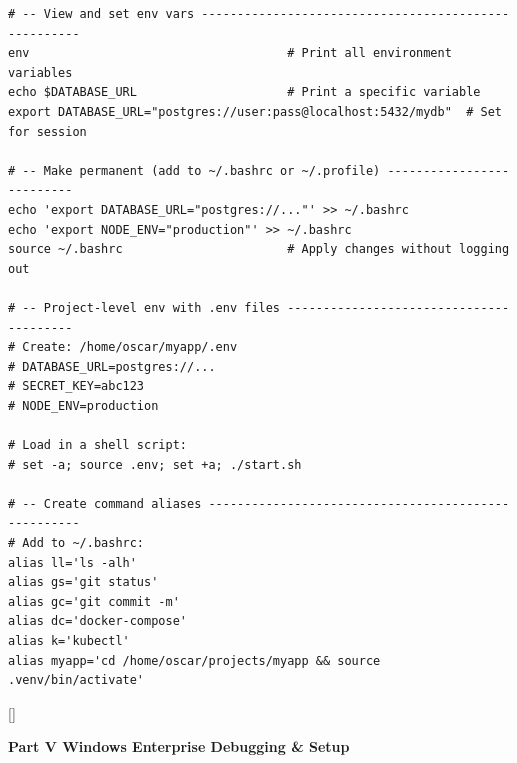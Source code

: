\documentclass[11pt, letterpaper]{article}
\newcommand{\bluesections}{%
  \titleformat{\section}{\large\bfseries\color{sectionblue}}{}{0em}{}[\color{sectionblue}\titlerule]%
  \titleformat{\subsection}{\normalsize\bfseries\color{sectionblue!80!black}}{}{0em}{}%
}
\newcommand{\partbanner}[3]{%
  \begin{tcolorbox}[colback=#1, colframe=#2, boxrule=1.2pt, arc=4pt,
    left=8pt, right=8pt, top=6pt, bottom=6pt]
    \begin{center}{\LARGE\bfseries #3}\end{center}
  \end{tcolorbox}%
}
\begin{document}
\begin{lstlisting}[style=shell, caption={Environment variables and shell configuration}]
# -- View and set env vars -----------------------------------------------------
env                                    # Print all environment variables
echo $DATABASE_URL                     # Print a specific variable
export DATABASE_URL="postgres://user:pass@localhost:5432/mydb"  # Set for session

# -- Make permanent (add to ~/.bashrc or ~/.profile) --------------------------
echo 'export DATABASE_URL="postgres://..."' >> ~/.bashrc
echo 'export NODE_ENV="production"' >> ~/.bashrc
source ~/.bashrc                       # Apply changes without logging out

# -- Project-level env with .env files ----------------------------------------
# Create: /home/oscar/myapp/.env
# DATABASE_URL=postgres://...
# SECRET_KEY=abc123
# NODE_ENV=production

# Load in a shell script:
# set -a; source .env; set +a; ./start.sh

# -- Create command aliases ----------------------------------------------------
# Add to ~/.bashrc:
alias ll='ls -alh'
alias gs='git status'
alias gc='git commit -m'
alias dc='docker-compose'
alias k='kubectl'
alias myapp='cd /home/oscar/projects/myapp && source .venv/bin/activate'
\end{lstlisting}

\newpage

\bluesections
{}
\partbanner{partbg}{sectionblue}{Part V \quad Windows Enterprise Debugging \& Setup}

\vspace{8pt}
\end{document}

